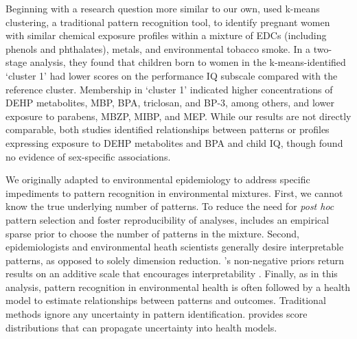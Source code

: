 Beginning with a research question more similar to our own, \citet{kalloo2021chemical} used k-means clustering, a traditional pattern recognition tool, to identify pregnant women with similar chemical exposure profiles within a mixture of EDCs (including phenols and phthalates), metals, and environmental tobacco smoke. In a two-stage analysis, they found that children born to women in the k-means-identified `cluster 1' had lower scores on the performance IQ subscale compared with the reference cluster. Membership in `cluster 1' indicated higher concentrations of DEHP metabolites, MBP, BPA, triclosan, and BP-3, among others, and lower exposure to parabens, MBZP, MIBP, and MEP. While our results are not directly comparable, both studies identified relationships between patterns or profiles expressing exposure to DEHP metabolites and BPA and child IQ, though \citet{kalloo2021chemical} found no evidence of sex-specific associations.

We originally adapted \bnmf to environmental epidemiology to address specific impediments to pattern recognition in environmental mixtures. First, we cannot know the true underlying number of patterns. To reduce the need for \textit{post hoc} pattern selection and foster reproducibility of analyses, \bnmf includes an empirical sparse prior to choose the number of patterns in the mixture. Second, epidemiologists and environmental heath scientists generally desire interpretable patterns, as opposed to solely dimension reduction. \bnmfc's non-negative priors return results on an additive scale that encourages interpretability \cite{lee1999learning}. Finally, as in this analysis, pattern recognition in environmental health is often followed by a health model to estimate relationships between patterns and outcomes. Traditional methods ignore any uncertainty in pattern identification. \bnmf provides score distributions that can propagate uncertainty into health models.

